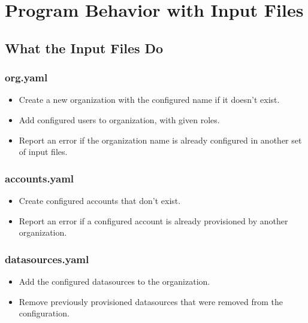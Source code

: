 \documentclass[letterpaper,10pt,english]{sphinxmanual}
\begin{document}
\section{Program Behavior with Input Files}
\label{\detokenize{inputStructure:program-behavior-with-input-files}}

\subsection{What the Input Files Do}
\label{\detokenize{inputStructure:what-the-input-files-do}}

\subsubsection{org.yaml}
\label{\detokenize{inputStructure:org-yaml}}\begin{itemize}
\item {} 
Create a new organization with the configured name if it doesn’t exist.

\item {} 
Add configured users to organization, with given roles.

\item {} 
Report an error if the organization name is already configured in another set
of input files.

\end{itemize}


\subsubsection{accounts.yaml}
\label{\detokenize{inputStructure:accounts-yaml}}\begin{itemize}
\item {} 
Create configured accounts that don’t exist.

\item {} 
Report an error if a configured account is already provisioned by another
organization.

\end{itemize}


\subsubsection{datasources.yaml}
\label{\detokenize{inputStructure:datasources-yaml}}\begin{itemize}
\item {} 
Add the configured datasources to the organization.

\item {} 
Remove previously provisioned datasources that were removed from the
configuration.

\end{itemize}
\end{document}
